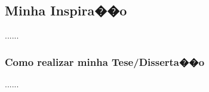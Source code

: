 \begin{center}
\chapter{} %
\end{center}

\section{Minha Inspira��o}

......

\subsection{Como realizar minha Tese/Disserta��o}

......

